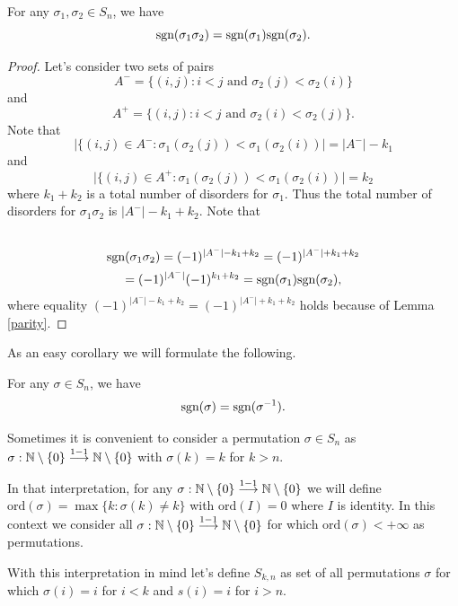 \documentclass[main.tex]{subfiles}
\begin{document}
\begin{theorem}
For any $\sigma_1, \sigma_2\in S_n$, we have
\begin{equation}
\text{sgn}(\sigma_1\sigma_2) = \text{sgn}(\sigma_1)\text{sgn}(\sigma_2).
\end{equation}
\begin{proof}
Let's consider two sets of pairs $$A^{-} = \{(i, j): i < j \text{ and } \sigma_2(j) < \sigma_2(i)\}$$ and 
$$A^{+} = \{(i, j): i < j \text{ and } \sigma_2(i) < \sigma_2(j)\}.$$
Note that
$$\bigg|\{(i, j)\in A^{-}: \sigma_1(\sigma_2(j)) < \sigma_1(\sigma_2(i)) \bigg| = |A^-| - k_1$$
and
$$\bigg|\{(i, j)\in A^{+}: \sigma_1(\sigma_2(j)) < \sigma_1(\sigma_2(i)) \bigg| = k_2$$  
where $k_1 + k_2$ is a total number of disorders for $\sigma_1$. Thus the total number of disorders for $\sigma_1\sigma_2$ is $|A^-| - k_1 + k_2$.
Note that
\begin{multline*}
\\
\text{sgn}(\sigma_1\sigma_2) = (-1)^{|A^-| - k_1 + k_2} = (-1)^{|A^-| + k_1 + k_2} 
\\= (-1)^{|A^-|}(-1)^{k_1 + k_2} = \text{sgn}(\sigma_1)\text{sgn}(\sigma_2),\\
\end{multline*}
where equality $(-1)^{|A^-| - k_1 + k_2} = (-1)^{|A^-| + k_1 + k_2} $ holds because of Lemma \ref{parity}.
\end{proof}

As an easy corollary we will formulate the following.

\begin{theorem}
For any $\sigma \in S_n$, we have
\begin{equation}
\text{sgn}(\sigma) = \text{sgn}(\sigma^{-1}).
\end{equation}
\end{theorem}
\end{theorem}

Sometimes it is convenient to consider a permutation 
$\sigma\in S_n$ as $\sigma:\mathbb{N}\setminus \{0\} \overset{1-1}{\longrightarrow} \mathbb{N}\setminus \{0\}$ with $\sigma(k) = k$ for $k > n$.

In that interpretation, for any $\sigma:\mathbb{N}\setminus \{0\} \overset{1-1}{\longrightarrow} \mathbb{N}\setminus \{0\}$ we will define $\text{ord}(\sigma) = \max\{k: \sigma(k)\not = k\}$ with $\text{ord}(I)=0$ where $I$ is identity. In this context we consider all $\sigma:\mathbb{N}\setminus \{0\} \overset{1-1}{\longrightarrow} \mathbb{N}\setminus \{0\}$ for which $\text{ord}(\sigma) < +\infty$ as permutations.

With this interpretation in mind let's define $S_{k, n}$ as set of all permutations $\sigma$ for which $\sigma(i) = i$ for $i < k$ and $s(i) = i$ for $i > n$. 
\end{document}
